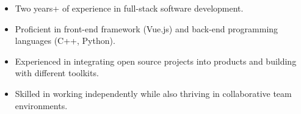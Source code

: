 

\begin{cvparagraph}
\vspace{0.3em}
\begin{itemize}
    \item Two years+ of experience in full-stack software development.
    \item Proficient in front-end framework (Vue.js) and back-end programming languages (C++, Python).
    \item Experienced in integrating open source projects into products and building with different toolkits.
    \item Skilled in working independently while also thriving in collaborative team environments.
\end{itemize}
\end{cvparagraph}

